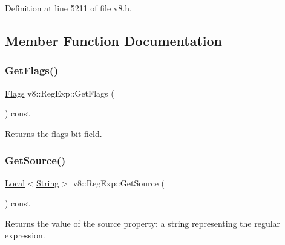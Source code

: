 Definition at line 5211 of file v8.\+h.



\subsection{Member Function Documentation}
\mbox{\label{classv8_1_1RegExp_aaf00a07b6f8368a1a99bf0bac327af21}} 
\subsubsection{\texorpdfstring{Get\+Flags()}{GetFlags()}}
{\footnotesize\ttfamily \mbox{\hyperlink{classv8_1_1RegExp_aa4718a5c1f18472aff3bf51ed694fc5a}{Flags}} v8\+::\+Reg\+Exp\+::\+Get\+Flags (\begin{DoxyParamCaption}{ }\end{DoxyParamCaption}) const}

Returns the flags bit field. \mbox{\label{classv8_1_1RegExp_ad43d2879796a6991ff19954f4755778a}} 
\subsubsection{\texorpdfstring{Get\+Source()}{GetSource()}}
{\footnotesize\ttfamily \mbox{\hyperlink{classv8_1_1Local}{Local}}$<$\mbox{\hyperlink{classv8_1_1String}{String}}$>$ v8\+::\+Reg\+Exp\+::\+Get\+Source (\begin{DoxyParamCaption}{ }\end{DoxyParamCaption}) const}

Returns the value of the source property\+: a string representing the regular expression. \mbox{\label{classv8_1_1RegExp_a805f632fe98d58160773a4ba1e424b15}} 
